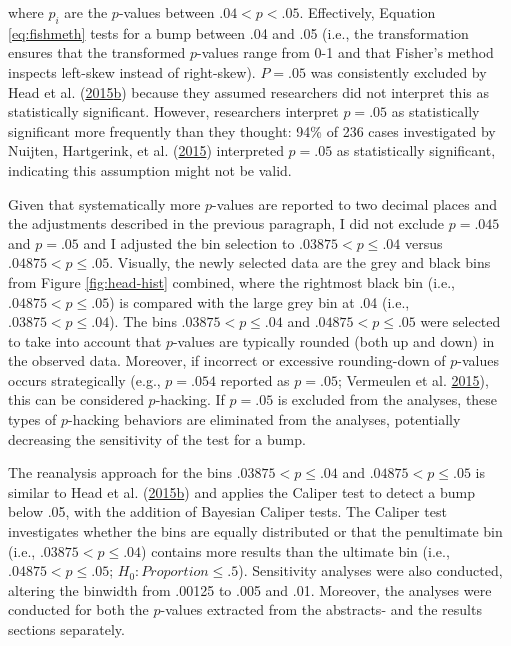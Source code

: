 \documentclass[a5paper]{book}
\begin{document}
where \(p_i\) are the \(p\)-values between \(.04<p<.05\). Effectively,
Equation \eqref{eq:fishmeth} tests for a bump between .04 and .05 (i.e.,
the transformation ensures that the transformed \(p\)-values range from
0-1 and that Fisher's method inspects left-skew instead of right-skew).
\(P=.05\) was consistently excluded by Head et al.
(\protect\hyperlink{ref-doi:10.1371ux2fjournal.pbio.1002106}{2015}\protect\hyperlink{ref-doi:10.1371ux2fjournal.pbio.1002106}{b})
because they assumed researchers did not interpret this as statistically
significant. However, researchers interpret \(p=.05\) as statistically
significant more frequently than they thought: 94\% of 236 cases
investigated by Nuijten, Hartgerink, et al.
(\protect\hyperlink{ref-doi:10.3758ux2fs13428-015-0664-2}{2015})
interpreted \(p=.05\) as statistically significant, indicating this
assumption might not be valid.

Given that systematically more \(p\)-values are reported to two decimal
places and the adjustments described in the previous paragraph, I did
not exclude \(p=.045\) and \(p=.05\) and I adjusted the bin selection to
\(.03875<p\leq.04\) versus \(.04875<p\leq.05\). Visually, the newly
selected data are the grey and black bins from Figure
\ref{fig:head-hist} combined, where the rightmost black bin (i.e.,
\(.04875<p\leq.05\)) is compared with the large grey bin at .04 (i.e.,
\(.03875<p\leq.04\)). The bins \(.03875<p\leq.04\) and
\(.04875<p\leq.05\) were selected to take into account that \(p\)-values
are typically rounded (both up and down) in the observed data. Moreover,
if incorrect or excessive rounding-down of \(p\)-values occurs
strategically (e.g., \(p=.054\) reported as \(p=.05\); Vermeulen et al.
\protect\hyperlink{ref-doi:10.1080ux2f19312458.2015.1096333}{2015}),
this can be considered \(p\)-hacking. If \(p=.05\) is excluded from the
analyses, these types of \(p\)-hacking behaviors are eliminated from the
analyses, potentially decreasing the sensitivity of the test for a bump.

The reanalysis approach for the bins \(.03875<p\leq.04\) and
\(.04875<p\leq.05\) is similar to Head et al.
(\protect\hyperlink{ref-doi:10.1371ux2fjournal.pbio.1002106}{2015}\protect\hyperlink{ref-doi:10.1371ux2fjournal.pbio.1002106}{b})
and applies the Caliper test to detect a bump below .05, with the
addition of Bayesian Caliper tests. The Caliper test investigates
whether the bins are equally distributed or that the penultimate bin
(i.e., \(.03875<p\leq.04\)) contains more results than the ultimate bin
(i.e., \(.04875<p\leq.05\); \(H_0:Proportion\leq.5\)). Sensitivity
analyses were also conducted, altering the binwidth from .00125 to .005
and .01. Moreover, the analyses were conducted for both the \(p\)-values
extracted from the abstracts- and the results sections separately.
\end{document}
